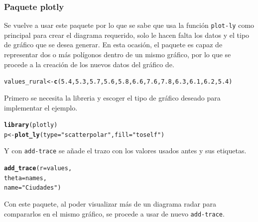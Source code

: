 \documentclass{article}\usepackage[]{graphicx}\usepackage[]{color}
\makeatletter
\newcommand{\hlnum}[1]{\textcolor[rgb]{0.686,0.059,0.569}{#1}}%
\newcommand{\hlstr}[1]{\textcolor[rgb]{0.192,0.494,0.8}{#1}}%
\newcommand{\hlstd}[1]{\textcolor[rgb]{0.345,0.345,0.345}{#1}}%
\newcommand{\hlkwb}[1]{\textcolor[rgb]{0.69,0.353,0.396}{#1}}%
\newcommand{\hlkwd}[1]{\textcolor[rgb]{0.737,0.353,0.396}{\textbf{#1}}}%
\newenvironment{kframe}{%
 \def\at@end@of@kframe{}%
 \ifinner\ifhmode%
  \def\at@end@of@kframe{\end{minipage}}%
  \begin{minipage}{\columnwidth}%
 \fi\fi%
 \def\FrameCommand##1{\hskip\@totalleftmargin \hskip-\fboxsep
 \colorbox{shadecolor}{##1}\hskip-\fboxsep
     \hskip-\linewidth \hskip-\@totalleftmargin \hskip\columnwidth}%
 \MakeFramed {\advance\hsize-\width
   \@totalleftmargin\z@ \linewidth\hsize
   \@setminipage}}%
 {\par\unskip\endMakeFramed%
 \at@end@of@kframe}
\newenvironment{knitrout}{}{} %
\makeatother
\begin{document}
\subsubsection{Paquete plotly}
Se vuelve a usar este paquete\cite{docu_plotly} por lo que se sabe que usa la funci\'on \texttt{plot-ly} como principal para crear el diagrama requerido, solo le hacen falta los datos y el tipo de gr\'afico que se desea generar. En esta ocasi\'on, el paquete es capaz de representar dos o m\'as pol\'igonos dentro de un mismo gr\'afico, por lo que se procede a la creaci\'on de los nuevos datos del gr\'afico de\cite[p\'ag 151]{Circle}.

\begin{knitrout}
\color{fgcolor}\begin{kframe}
\begin{alltt}
\hlstd{values_rural} \hlkwb{<-} \hlkwd{c}\hlstd{(}\hlnum{5.4}\hlstd{,} \hlnum{5.3}\hlstd{,} \hlnum{5.7}\hlstd{,} \hlnum{5.6}\hlstd{,} \hlnum{5.8}\hlstd{,} \hlnum{6.6}\hlstd{,} \hlnum{7.6}\hlstd{,} \hlnum{7.8}\hlstd{,} \hlnum{6.3}\hlstd{,} \hlnum{6.1}\hlstd{,} \hlnum{6.2}\hlstd{,} \hlnum{5.4}\hlstd{)}
\end{alltt}
\end{kframe}
\end{knitrout}
Primero se necesita la libreria y escoger el tipo de gr\'afico deseado para implementar el ejemplo.
\begin{knitrout}
\color{fgcolor}\begin{kframe}
\begin{alltt}
\hlkwd{library}(plotly)
p <- \hlkwd{plot_ly}(type = \hlstr{"scatterpolar"}, fill = \hlstr{"toself"}) %
\end{alltt}
\end{kframe}
\end{knitrout}
Y con \texttt{add-trace} se a\~nade el trazo con los valores usados antes y sus etiquetas.
\begin{knitrout}
\color{fgcolor}\begin{kframe}
\begin{alltt}
  \hlkwd{add_trace}( r = values,
             theta = names,
             name = \hlstr{"Ciudades"}) %
\end{alltt}
\end{kframe}
\end{knitrout}
Con este paquete, al poder visualizar m\'as de un diagrama radar para compararlos en el mismo gr\'afico, se procede a usar de nuevo \texttt{add-trace}.
\end{document}
